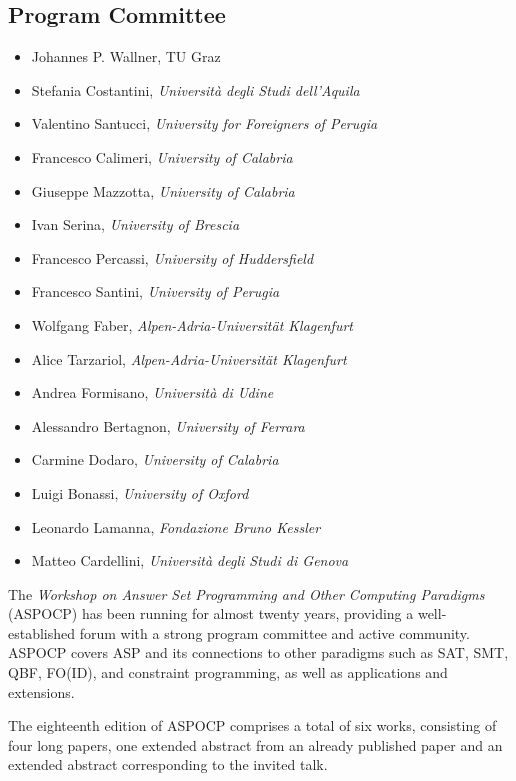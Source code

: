 \documentclass[
]{ceurart}
\begin{document}
\subsection*{Program Committee}
\begin{itemize}
  \item Johannes P. Wallner, TU Graz
  \item Stefania Costantini, \emph{Università degli Studi dell'Aquila}
  \item Valentino Santucci, \emph{University for Foreigners of Perugia}
  \item Francesco Calimeri, \emph{University of Calabria}
  \item Giuseppe Mazzotta, \emph{University of Calabria}
  \item Ivan Serina, \emph{University of Brescia}
  \item Francesco Percassi, \emph{University of Huddersfield}
  \item Francesco Santini, \emph{University of Perugia}
  \item Wolfgang Faber, \emph{Alpen-Adria-Universität Klagenfurt}
  \item Alice Tarzariol, \emph{Alpen-Adria-Universität Klagenfurt}
  \item Andrea Formisano, \emph{Università di Udine}
  \item Alessandro Bertagnon, \emph{University of Ferrara}
  \item Carmine Dodaro, \emph{University of Calabria}
  \item Luigi Bonassi, \emph{University of Oxford}
  \item Leonardo Lamanna, \emph{Fondazione Bruno Kessler}
  \item Matteo Cardellini, \emph{Università degli Studi di Genova}
\end{itemize}



\noindent
The \emph{Workshop on Answer Set Programming and Other Computing Paradigms} (ASPOCP) has been running for almost twenty years, providing a well-established forum with a strong program committee and active community. ASPOCP covers ASP and its connections to other paradigms such as SAT, SMT, QBF, FO(ID), and constraint programming, as well as applications and extensions.

The eighteenth edition of ASPOCP comprises a total of six works, consisting of four long papers, one extended abstract from an already published paper and an extended abstract corresponding to the invited talk.
\end{document}
